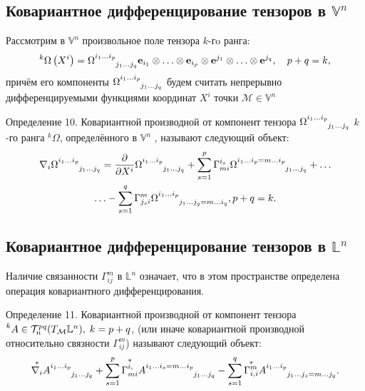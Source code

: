 \documentclass[14pt,a4paper]{extarticle}
\begin{document}
\subsection{Ковариантное дифференцирование тензоров в $\mathbb{V}^n$}
Рассмотрим в $\mathbb{V}^n$ произвольное поле тензора $k$-гo ранга:
\begin{equation}\label{eq23}
	^{k} \Omega\left(X^{i}\right)=\Omega\indices{^{i_{1} \ldots i_{p}}_{j_1 \ldots j_q }} \mathbf{e}_{i_{1}} \otimes \ldots \otimes \mathbf{e}_{i_{p}} \otimes \mathbf{e}^{j_{1}} \otimes \ldots \otimes \mathbf{e}^{j_{q}}, \quad p+q=k,
\end{equation}
причём его компоненты $\Omega\indices{^{i_{1} \ldots i_{p}}_{j_1 \ldots j_q }}$ будем считать непрерывно дифференцируемыми функциями координат $X^i$ точки $\mathcal{M} \in \mathbb{V}^n$

Определение 10. Ковариантной производной от компонент тензора $\Omega\indices{^{i_{1} \ldots i_{p}}_{j_1 \ldots j_q }}$ $k$-го ранга $^{k} \Omega$, определённого в $\mathbb{V}^n$ , называют следующий объект:
\begin{multline}\label{eq24}
	\nabla_i \Omega\indices{^{i_{1} \ldots i_{p}}_{j_1 \ldots j_q }} = \pdv{}{X^i} \Omega\indices{^{i_{1} \ldots i_{p}}_{j_1 \ldots j_q }} + \sum\limits_{s=1}^{p} \Gamma_{mi}^{i_s} \Omega\indices{^{i_{1} \ldots i_{p} = m \ldots i_p}_{j_1 \ldots j_q }} + \ldots \\ 
	\ldots - \sum\limits_{s=1}^q \Gamma_{j_si}^{m} \Omega\indices{^{i_{1} \ldots i_{p}}_{j_1 \ldots j_q = m \ldots i_q}}, p+q=k.
\end{multline}

\subsection{Ковариантное дифференцирование тензоров в $\mathbb{L}^n$}
Наличие связанности $\Gamma_{ij}^m$ в $\mathbb{L}^n$ означает, что в этом пространстве определена операция ковариантного дифференцирования.

Определение 11. Ковариантной производной от компонент тензора $\prescript{k}{}{A} \in \mathcal{T}_n^{pq}(T_{\mathcal{M}}\mathbb{L}^n), \; k=p+q$, (или иначе ковариантной производной относительно связности $\Gamma_{ij}^m$) называют следующий объект:
\begin{equation}\label{eq25}
	\overset{*}{\nabla_i}A\indices{^{i_1 \ldots i_p}_{j_1 \ldots j_q}} + \sum\limits_{s = 1}^p \overset{*}{\Gamma_{mi}^{i,}} A\indices{^{i_1 \ldots i_s = m \ldots i_p}_{j_1 \ldots j_q}} - \sum\limits_{s=1}^q \overset{*}{\Gamma_{i,i}^{m}} A\indices{^{i_1 \ldots i_p}_{j_1 \ldots j_s = m \ldots j_q}}.
\end{equation}
\end{document}

